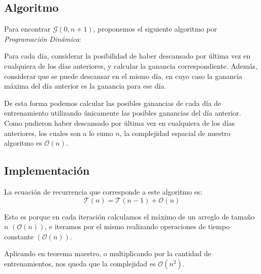 \subsection{Algoritmo}

Para encontrar $\mathcal{G} \left( 0, n + 1 \right)$, proponemos el siguiente
algoritmo por \textit{Programaci\'on Din\'amica}:

Para cada d\'ia, considerar la posibilidad de haber descansado por \'ultima
vez en cualquiera de los d\'ias anteriores, y calcular la ganancia
correspondiente. Adem\'as, considerar que se puede descansar en el mismo d\'ia,
en cuyo caso la ganancia m\'axima del d\'ia anterior es la ganancia para ese
d\'ia.

De esta forma podemos calcular las posibles ganancias de cada d\'ia de
entrenamiento utilizando \'unicamente las posibles ganancias del d\'ia
anterior. Como pudieron haber descansado por \'ultima vez en cualquiera de los
d\'ias anteriores, los cuales son a lo sumo $n$, la complejidad espacial de
nuestro algoritmo es $\mathcal{O}(n)$.

\subsection{Implementaci\'on}



La ecuaci\'on de recurrencia que corresponde a este algoritmo es:
\begin{equation*}
    \mathcal{T}(n) = \mathcal{T}\left(n - 1\right) + \mathcal{O}\left(n\right)
\end{equation*}

Esto es porque en cada iteraci\'on calculamos el m\'aximo de un arreglo de
tama\~no $n$ $\left( \mathcal{O}(n) \right)$, e iteramos por el mismo
realizando operaciones de tiempo constante $\left( \mathcal{O}(n) \right)$.

Aplicando en teorema maestro, o multiplicando por la cantidad de
entrenamientos, nos queda que la complejidad es $\mathcal{O}(n^2)$.
